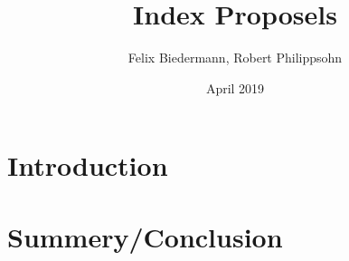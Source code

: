 \documentclass{article}
\title{Index Proposels}
\author{Felix Biedermann, Robert Philippsohn }
\date{April 2019}
\begin{document}
\maketitle

\section{Introduction}
\section{Summery/Conclusion}
\end{document}
